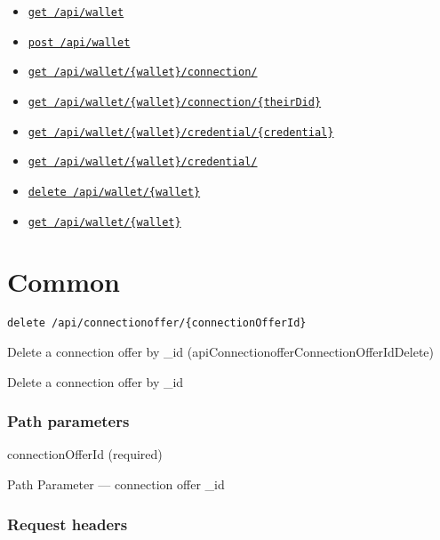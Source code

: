 \begin{itemize}
\tightlist
\item
  \protect\hyperlink{apiWalletGet}{\texttt{get\ /api/wallet}}
\item
  \protect\hyperlink{apiWalletPost}{\texttt{post\ /api/wallet}}
\item
  \protect\hyperlink{apiWalletWalletConnectionGet}{\texttt{get\ /api/wallet/\{wallet\}/connection/}}
\item
  \protect\hyperlink{apiWalletWalletConnectionTheirDidGet}{\texttt{get\ /api/wallet/\{wallet\}/connection/\{theirDid\}}}
\item
  \protect\hyperlink{apiWalletWalletCredentialCredentialGet}{\texttt{get\ /api/wallet/\{wallet\}/credential/\{credential\}}}
\item
  \protect\hyperlink{apiWalletWalletCredentialGet}{\texttt{get\ /api/wallet/\{wallet\}/credential/}}
\item
  \protect\hyperlink{apiWalletWalletDelete}{\texttt{delete\ /api/wallet/\{wallet\}}}
\item
  \protect\hyperlink{apiWalletWalletGet}{\texttt{get\ /api/wallet/\{wallet\}}}
\end{itemize}

\hypertarget{common-1}{%
\section{\texorpdfstring{\protect\hypertarget{Common}{}{Common}}{Common}}\label{common-1}}

\protect\hypertarget{apiConnectionofferConnectionOfferIdDelete}{}{}

\begin{verbatim}
delete /api/connectionoffer/{connectionOfferId}
\end{verbatim}

Delete a connection offer by \_id
({apiConnectionofferConnectionOfferIdDelete})

Delete a connection offer by \_id

\hypertarget{path-parameters}{%
\subsubsection{Path parameters}\label{path-parameters}}

connectionOfferId (required)

{Path Parameter} --- connection offer \_id

\hypertarget{request-headers}{%
\subsubsection{Request headers}\label{request-headers}}

